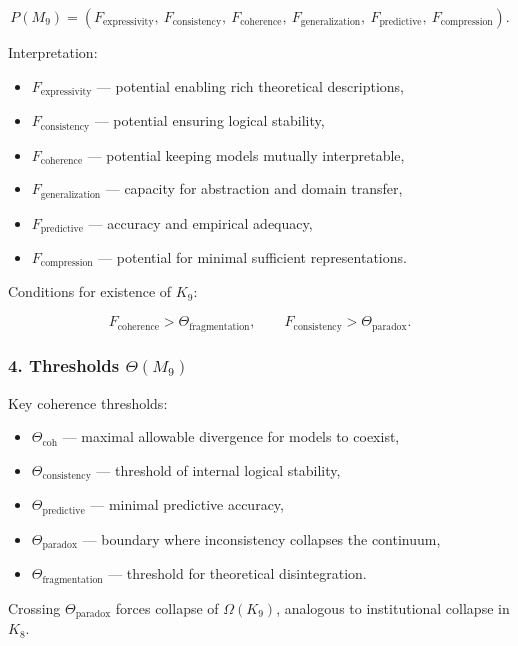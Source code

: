 \[
P(M_9)=
(F_{\mathrm{expressivity}},\
F_{\mathrm{consistency}},\
F_{\mathrm{coherence}},\
F_{\mathrm{generalization}},\
F_{\mathrm{predictive}},\
F_{\mathrm{compression}}).
\]

Interpretation:

\begin{itemize}
    \item $F_{\mathrm{expressivity}}$ — potential enabling rich theoretical descriptions,
    \item $F_{\mathrm{consistency}}$ — potential ensuring logical stability,
    \item $F_{\mathrm{coherence}}$ — potential keeping models mutually interpretable,
    \item $F_{\mathrm{generalization}}$ — capacity for abstraction and domain transfer,
    \item $F_{\mathrm{predictive}}$ — accuracy and empirical adequacy,
    \item $F_{\mathrm{compression}}$ — potential for minimal sufficient representations.
\end{itemize}

Conditions for existence of $K_9$:

\[
F_{\mathrm{coherence}}>\Theta_{\mathrm{fragmentation}},
\qquad
F_{\mathrm{consistency}}>\Theta_{\mathrm{paradox}}.
\]

\subsubsection*{4. Thresholds \texorpdfstring{$\Theta(M_9)$}{\Theta(M_9)}}

Key coherence thresholds:

\begin{itemize}
    \item $\Theta_{\mathrm{coh}}$ — maximal allowable divergence for models to coexist,
    \item $\Theta_{\mathrm{consistency}}$ — threshold of internal logical stability,
    \item $\Theta_{\mathrm{predictive}}$ — minimal predictive accuracy,
    \item $\Theta_{\mathrm{paradox}}$ — boundary where inconsistency collapses the continuum,
    \item $\Theta_{\mathrm{fragmentation}}$ — threshold for theoretical disintegration.
\end{itemize}

Crossing $\Theta_{\mathrm{paradox}}$ forces collapse of $\Omega(K_9)$,
analogous to institutional collapse in $K_8$.

